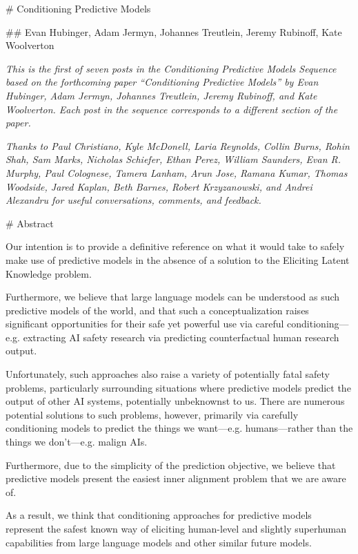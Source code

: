 # Conditioning Predictive Models

## Evan Hubinger, Adam Jermyn, Johannes Treutlein, Jeremy Rubinoff, Kate Woolverton

\textit{This is the first of seven posts in the Conditioning Predictive Models Sequence based on the forthcoming paper ``Conditioning Predictive Models'' by Evan Hubinger, Adam Jermyn, Johannes Treutlein, Jeremy Rubinoff, and Kate Woolverton. Each post in the sequence corresponds to a different section of the paper.}

\textit{Thanks to Paul Christiano, Kyle McDonell, Laria Reynolds, Collin Burns, Rohin Shah, Sam Marks, Nicholas Schiefer, Ethan Perez, William Saunders, Evan R. Murphy, Paul Colognese, Tamera Lanham, Arun Jose, Ramana Kumar, Thomas Woodside, Jared Kaplan, Beth Barnes, Robert Krzyzanowski, and Andrei Alexandru for useful conversations, comments, and feedback.}


# Abstract

Our intention is to provide a definitive reference on what it would take to safely make use of predictive models in the absence of a solution to the Eliciting Latent Knowledge\cite{TODO: cite https://www.alignmentforum.org/posts/qHCDysDnvhteW7kRd/arc-s-first-technical-report-eliciting-latent-knowledge} problem.

Furthermore, we believe that large language models can be understood as such predictive models of the world, and that such a conceptualization raises significant opportunities for their safe yet powerful use via careful conditioning---e.g. extracting AI safety research via predicting counterfactual human research output.

Unfortunately, such approaches also raise a variety of potentially fatal safety problems, particularly surrounding situations where predictive models predict the output of other AI systems, potentially unbeknownst to us. There are numerous potential solutions to such problems, however, primarily via carefully conditioning models to predict the things we want---e.g. humans---rather than the things we don't---e.g. malign AIs.

Furthermore, due to the simplicity of the prediction objective, we believe that predictive models present the easiest inner alignment problem that we are aware of.

As a result, we think that conditioning approaches for predictive models represent the safest known way of eliciting human-level and slightly superhuman capabilities from large language models and other similar future models.




